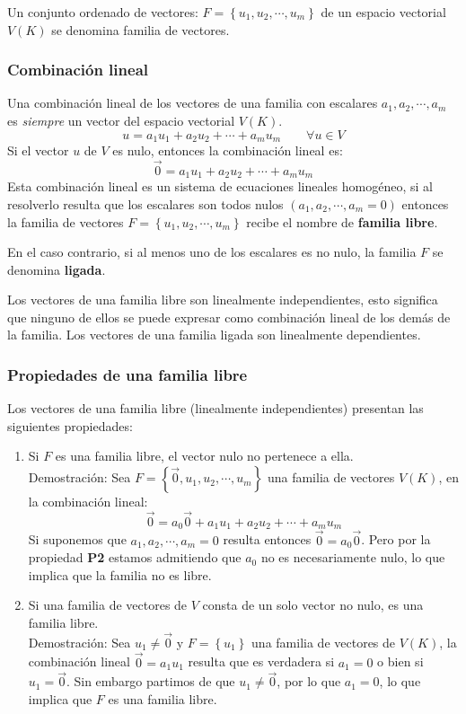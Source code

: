Un conjunto ordenado de vectores: \(F = \left\{u_1,u_2,\cdots,u_m\right\}\) de un espacio vectorial \(V(K)\) se denomina familia de vectores.

\subsubsection{Combinación lineal}

Una combinación lineal de los vectores de una familia con escalares \(a_1, a_2, \cdots, a_m\) es \textit{siempre} un vector del espacio vectorial \(V(K)\).
\[
  u = a_1 u_1 + a_2 u_2 + \cdots + a_m u_m \qquad \forall u \in V
\]
Si el vector \(u\) de \(V\) es nulo, entonces la combinación lineal es:
\[
  \vec{0} = a_1 u_1 + a_2 u_2 + \cdots + a_m u_m
\]
Esta combinación lineal es un sistema de ecuaciones lineales homogéneo, si al resolverlo resulta que los escalares son todos nulos \((a_1,a_2,\cdots,a_m = 0)\) entonces la familia de vectores \(F=\left\{u_1, u_2, \cdots, u_m \right\}\) recibe el nombre de \textbf{familia libre}.

En el caso contrario, si al menos uno de los escalares es no nulo, la familia \(F\) se denomina \textbf{ligada}.

Los vectores de una familia libre son linealmente independientes, esto significa que ninguno de ellos se puede expresar como combinación lineal de los demás de la familia. Los vectores de una familia ligada son linealmente dependientes.

\subsubsection{Propiedades de una familia libre}

Los vectores de una familia libre (linealmente independientes) presentan las siguientes propiedades:
\begin{enumerate}
  \item Si \(F\) es una familia libre, el vector nulo no pertenece a ella. \\ Demostración: Sea \(F=\left\{\vec{0},u_1, u_2, \cdots, u_m\right\}\) una familia de vectores \(V(K)\), en la combinación lineal: \[
    \vec{0} = a_0 \vec{0} + a_1 u_1 + a_2 u_2 + \cdots + a_m u_m
  \]
  Si suponemos que \(a_1, a_2, \cdots, a_m = 0\) resulta entonces \(\vec{0}=a_0 \vec{0}\). Pero por la propiedad \textbf{P2} estamos admitiendo que \(a_0\) no es necesariamente nulo, lo que implica que la familia no es libre.
  \item Si una familia de vectores de \(V\) consta de un solo vector no nulo, es una familia libre. \\ Demostración: Sea \(u_1 \neq \vec{0}\) y \(F=\left\{u_1\right\}\) una familia de vectores de \(V(K)\), la combinación lineal \(\vec{0} = a_1 u_1\) resulta que es verdadera si \(a_1 = 0\) o bien si \(u_1 = \vec{0}\). Sin embargo partimos de que \(u_1 \neq \vec{0}\), por lo que \(a_1 = 0\), lo que implica que \(F\) es una familia libre.
\end{enumerate}


